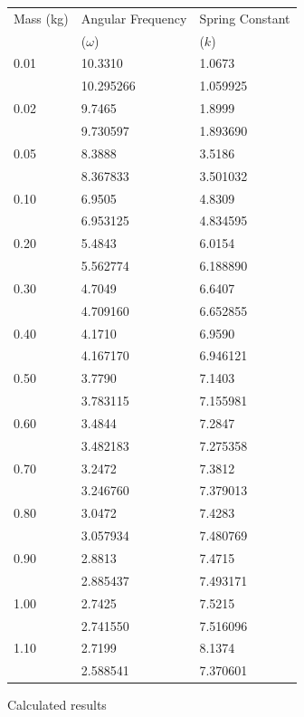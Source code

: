 \documentclass{article}
\numberwithin{figure}{section}
\numberwithin{table}{section}
\begin{document}
\begin{figure}[!hbp] 
    \centering
    \begin{tabular}{lll} 
            \toprule
            Mass (kg) & Angular Frequency & Spring Constant \\
                        & ($\omega$) & ($k$) \\ 
            \midrule 
            0.01 & 10.3310 & 1.0673 \\ 
            & 10.295266 & 1.059925 \\
            0.02 & 9.7465 & 1.8999 \\ 
            & 9.730597 & 1.893690 \\
            0.05 & 8.3888 & 3.5186 \\ 
            & 8.367833 & 3.501032 \\
            0.10 & 6.9505 & 4.8309 \\ 
            & 6.953125 & 4.834595 \\
            0.20 & 5.4843 & 6.0154 \\ 
            & 5.562774 & 6.188890 \\
            0.30 & 4.7049 & 6.6407 \\ 
            & 4.709160 & 6.652855 \\
            0.40 & 4.1710 & 6.9590 \\ 
            & 4.167170 & 6.946121 \\
            0.50 & 3.7790 & 7.1403 \\ 
            & 3.783115 & 7.155981 \\
            0.60 & 3.4844 & 7.2847 \\ 
            & 3.482183 & 7.275358 \\
            0.70 & 3.2472 & 7.3812 \\ 
            & 3.246760 & 7.379013 \\
            0.80 & 3.0472 & 7.4283 \\ 
            & 3.057934 & 7.480769 \\
            0.90 & 2.8813 & 7.4715 \\ 
            & 2.885437 & 7.493171 \\
            1.00 & 2.7425 & 7.5215 \\ 
            & 2.741550 & 7.516096 \\
            1.10 & 2.7199 & 8.1374 \\ 
            & 2.588541 & 7.370601 \\ 
            \bottomrule
    \end{tabular} 
    \caption{Calculated results} 
    \label{results} 
\end{figure}
\end{document}
